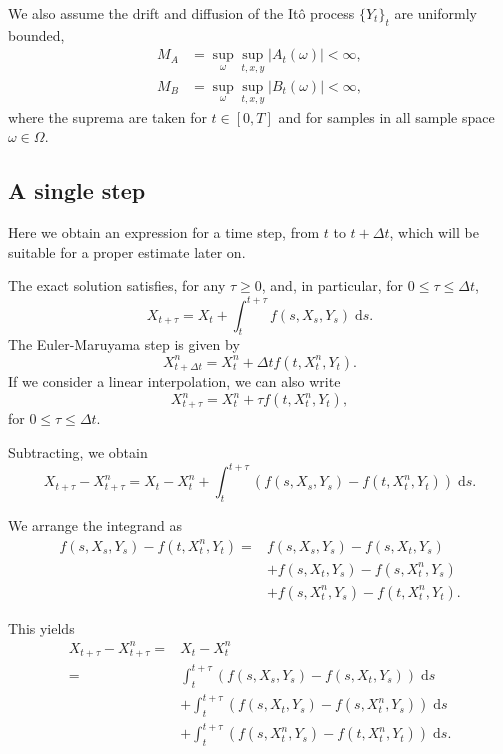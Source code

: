 \documentclass[reqno,12pt]{amsart}
\theoremstyle{plain}%
\theoremstyle{definition}
\begin{document}
We also assume the drift and diffusion of the It\^o process $\{Y_t\}_t$ are uniformly bounded,
\begin{align}
  \label{MAassumption} M_A & = \sup_\omega \sup_{t, x, y} |A_t(\omega)| < \infty, \\
  \label{MBassumption} M_B & = \sup_\omega\sup_{t, x, y} |B_t(\omega)| < \infty,
\end{align}
where the suprema are taken for $t\in [0, T]$ and for samples in all sample space $\omega\in \Omega$.

\subsection{A single step}

Here we obtain an expression for a time step, from $t$ to $t + \Delta t$, which will be suitable for a proper estimate later on.

The exact solution satisfies, for any $\tau \geq 0$, and, in particular, for $0\leq \tau \leq \Delta t$, 
$$
X_{t + \tau} = X_t + \int_t^{t + \tau} f(s, X_s, Y_s) \;\mathrm{d}s.
$$
The Euler-Maruyama step is given by
$$
X_{t+\Delta t}^n = X_t^n + \Delta t f(t, X_t^n, Y_t).
$$
If we consider a linear interpolation, we can also write
$$
X_{t + \tau}^n = X_t^n + \tau f(t, X_t^n, Y_t),
$$
for $0\leq \tau \leq \Delta t$.

Subtracting, we obtain
$$
X_{t + \tau} - X_{t + \tau}^n = X_t - X_t^n + \int_t^{t + \tau} \left( f(s, X_s, Y_s) - f(t, X_t^n, Y_t) \right)\;\mathrm{d}s.
$$

We arrange the integrand as
\begin{align*}
f(s, X_s, Y_s) - f(t, X_t^n, Y_t) = & f(s, X_s, Y_s) - f(s, X_t, Y_s) \\ 
 & + f(s, X_t, Y_s) - f(s, X_t^n, Y_s) \\
 & + f(s, X_t^n, Y_s) - f(t, X_t^n, Y_t).
\end{align*}

This yields
\begin{align*}
X_{t + \tau} - X_{t + \tau}^n  = & X_t - X_t^n \\
= &  \int_t^{t + \tau} \left( f(s, X_s, Y_s) - f(s, X_t, Y_s) \right)\;\mathrm{d}s \\ 
 & + \int_t^{t + \tau} \left( f(s, X_t, Y_s) - f(s, X_t^n, Y_s) \right)\;\mathrm{d}s \\
 & + \int_t^{t + \tau} \left( f(s, X_t^n, Y_s) - f(t, X_t^n, Y_t) \right)\;\mathrm{d}s.
\end{align*}
\end{document}
